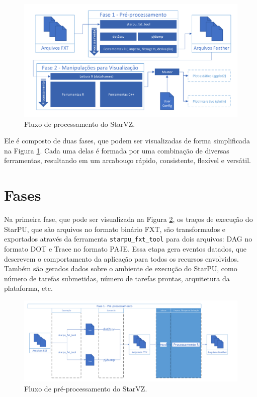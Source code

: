 \begin{figure}[ht]
 \centerline{\includegraphics[width=1\textwidth]{./img/all-proc.pdf}}
 \caption{Fluxo de processamento do StarVZ.}
 \label{fig:starvz-workflow-general}
\end{figure}

Ele é composto de duas fases, que podem ser visualizadas de forma simplificada na Figura \ref{fig:starvz-workflow-general}.
Cada uma delas é formada por uma combinação de diversas ferramentas, resultando em um 
arcabouço rápido, consistente, flexível e versátil.



\section{Fases}\label{sect:starvz-phases}

Na primeira fase, que pode ser visualizada na Figura \ref{fig:starvz-workflow1}, os 
traços de execução do StarPU, que são arquivos no formato binário FXT, são 
transformados e exportados através da ferramenta \texttt{starpu\_fxt\_tool} para dois 
arquivos: DAG no formato DOT e Trace no formato PAJE. Essa etapa gera eventos 
datados, que descrevem o comportamento da aplicação para todos os recursos 
envolvidos. 
Também são gerados dados sobre o ambiente de execução do StarPU, 
como número de tarefas submetidas,
número de tarefas prontas, arquitetura da plataforma, etc.

\begin{figure}[ht]
 \centerline{\includegraphics[width=1\textwidth]{./img/step1-simpler.pdf}}
 \caption{Fluxo de pré-processamento do StarVZ.}
 \label{fig:starvz-workflow1}
\end{figure}

